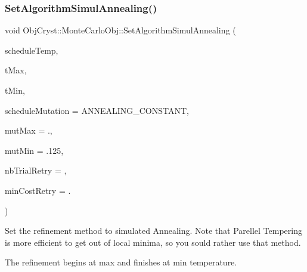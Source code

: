 \subsubsection{\texorpdfstring{SetAlgorithmSimulAnnealing()}{SetAlgorithmSimulAnnealing()}}
{\footnotesize\ttfamily void Obj\+Cryst\+::\+Monte\+Carlo\+Obj\+::\+Set\+Algorithm\+Simul\+Annealing (\begin{DoxyParamCaption}\item[{const Annealing\+Schedule}]{schedule\+Temp,  }\item[{const R\+E\+AL}]{t\+Max,  }\item[{const R\+E\+AL}]{t\+Min,  }\item[{const Annealing\+Schedule}]{schedule\+Mutation = {\ttfamily ANNEALING\+\_\+CONSTANT},  }\item[{const R\+E\+AL}]{mut\+Max = {.},  }\item[{const R\+E\+AL}]{mut\+Min = {\ttfamily .125},  }\item[{const long}]{nb\+Trial\+Retry = {},  }\item[{const R\+E\+AL}]{min\+Cost\+Retry = {.} }\end{DoxyParamCaption})}



Set the refinement method to simulated Annealing. Note that Parellel Tempering is more efficient to get out of local minima, so you sould rather use that method. 

The refinement begins at max and finishes at min temperature.


